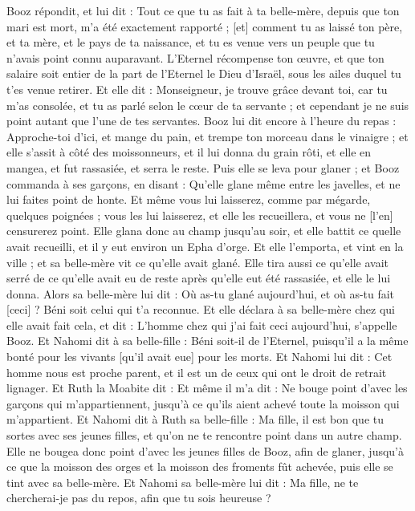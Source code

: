 \begin{multicols}{2}
Booz répondit, et lui dit : Tout ce que tu as fait à ta belle-mère, depuis que ton mari est mort, m'a été exactement rapporté ; [et] comment tu as laissé ton père, et ta mère, et le pays de ta naissance, et tu es venue vers un peuple que tu n'avais point connu auparavant.
L'Eternel récompense ton œuvre, et que ton salaire soit entier de la part de l'Eternel le Dieu d'Israël, sous les ailes duquel tu t'es venue retirer.
Et elle dit : Monseigneur, je trouve grâce devant toi, car tu m'as consolée, et tu as parlé selon le cœur de ta servante ; et cependant je ne suis point autant que l'une de tes servantes.
Booz lui dit encore à l'heure du repas : Approche-toi d'ici, et mange du pain, et trempe ton morceau dans le vinaigre ; et elle s'assit à côté des moissonneurs, et il lui donna du grain rôti, et elle en mangea, et fut rassasiée, et serra le reste.
Puis elle se leva pour glaner ; et Booz commanda à ses garçons, en disant : Qu'elle glane même entre les javelles, et ne lui faites point de honte.
Et même vous lui laisserez, comme par mégarde, quelques poignées ; vous les lui laisserez, et elle les recueillera, et vous ne [l'en] censurerez point.
Elle glana donc au champ jusqu'au soir, et elle battit ce quelle avait recueilli, et il y eut environ un Epha d'orge.
Et elle l'emporta, et vint en la ville ; et sa belle-mère vit ce qu'elle avait glané. Elle tira aussi ce qu'elle avait serré de ce qu'elle avait eu de reste après qu'elle eut été rassasiée, et elle le lui donna.
Alors sa belle-mère lui dit : Où as-tu glané aujourd'hui, et où as-tu fait [ceci] ? Béni soit celui qui t'a reconnue. Et elle déclara à sa belle-mère chez qui elle avait fait cela, et dit : L'homme chez qui j'ai fait ceci aujourd'hui, s'appelle Booz.
Et Nahomi dit à sa belle-fille : Béni soit-il de l'Eternel, puisqu'il a la même bonté pour les vivants [qu'il avait eue] pour les morts. Et Nahomi lui dit : Cet homme nous est proche parent, et il est un de ceux qui ont le droit de retrait lignager.
Et Ruth la Moabite dit : Et même il m'a dit : Ne bouge point d'avec les garçons qui m'appartiennent, jusqu'à ce qu'ils aient achevé toute la moisson qui m'appartient.
Et Nahomi dit à Ruth sa belle-fille : Ma fille, il est bon que tu sortes avec ses jeunes filles, et qu'on ne te rencontre point dans un autre champ.
Elle ne bougea donc point d'avec les jeunes filles de Booz, afin de glaner, jusqu'à ce que la moisson des orges et la moisson des froments fût achevée, puis elle se tint avec sa belle-mère.
\VerseOne{}Et Nahomi sa belle-mère lui dit : Ma fille, ne te chercherai-je pas du repos, afin que tu sois heureuse ?

\end{multicols}
